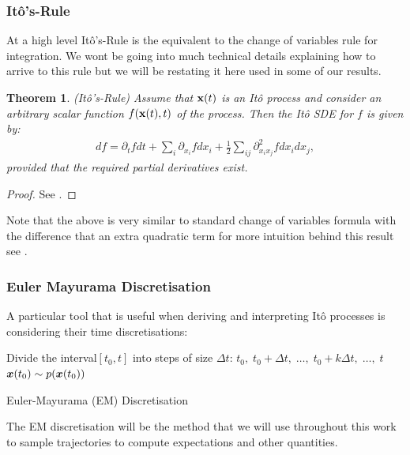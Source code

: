 \documentclass[a4paper,12pt,twoside,openright]{report}
\newtheorem{theorem}{Theorem}
\theoremstyle{definition}
\begin{document}
\subsubsection{Itô's-Rule}

At a high level Itô's-Rule is the equivalent to the change of variables rule for integration. We wont be going into much technical details explaining how to arrive to this rule but we will be restating it here used in some of our results. 

\begin{theorem}
  (Itô's-Rule) Assume that ${\mathbf{x}}(t)$ is an Itô process and consider an arbitrary scalar function $f({\mathbf{x}}(t), t)$ of the process. Then the Itô SDE for $f$ is given by:
  \begin{align}\label{eq:ito_rule}
      df = \partial_t f dt + \sum_i \partial_{{x_i}} f dx_i + \frac{1}{2}\sum_{ij} \partial^2_{{x_i}{x_j}} f dx_i dx_j,
  \end{align}
  provided that the required partial derivatives exist. 
\end{theorem}
\begin{proof}
See \cite{oksendal2003stochastic}.
\end{proof}
Note that the above is very similar to standard change of variables formula with the difference that an extra quadratic term for more intuition behind this result see \cite[Chapter~4]{sarkka2019applied}.

\subsubsection{Euler Mayurama Discretisation}

A particular tool that is useful when deriving and interpreting Itô processes is considering their time discretisations:
\begin{algorithm} \label{alg:em}
Divide the interval$[t_0, t]$ into steps of size $\Delta t$: $t_0, \;t_0 + \Delta t,\; \hdots ,\; t_0 + k \Delta t,\; \hdots, \;t$ \\
${\bm{x}}(t_0) \sim p({\bm{x}}(t_0))$\\
\caption{Euler-Mayurama (EM) Discretisation }
\end{algorithm}
The EM discretisation will be the method that we will use throughout this work to sample trajectories to compute expectations and other quantities.
\end{document}
